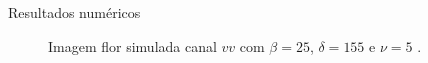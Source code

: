 \documentclass[10pt]{beamer}
\begin{document}
\begin{frame}{Resultados numéricos}
\begin{figure}[hbt]
	\caption{Imagem flor simulada canal $vv$ com $\beta = 25$, $\delta = 155$ e $\nu = 5$ .}
\endminipage\hfill
{}

\end{figure}
\end{frame}
\end{document}
